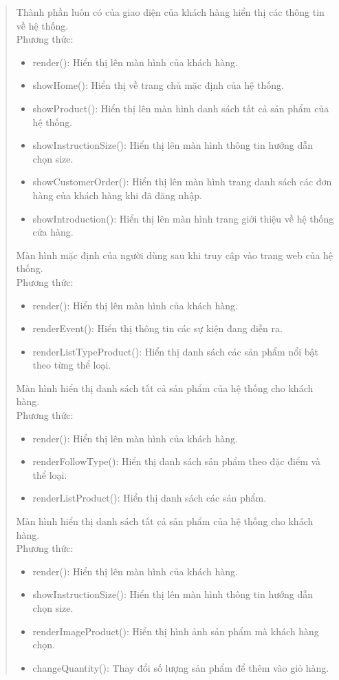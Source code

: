 \begin{quote}
    Thành phần luôn có của giao diện của khách hàng hiển thị các thông tin về hệ thống.\\
    Phương thức:
    \begin{itemize}
        \item render(): Hiển thị lên màn hình của khách hàng.
        \item showHome(): Hiển thị về trang chủ mặc định của hệ thống.
        \item showProduct(): Hiển thị lên màn hình danh sách tất cả sản phẩm của hệ thống.
        \item showInstructionSize(): Hiển thị lên màn hình thông tin hướng dẫn chọn size.
        \item showCustomerOrder(): Hiển thị lên màn hình trang danh sách các đơn hàng của khách hàng khi đã đăng nhập.
        \item showIntroduction(): Hiển thị lên màn hình trang giới thiệu về hệ thống cửa hàng.
    \end{itemize}
   
    Màn hình mặc định của người dùng sau khi truy cập vào trang web của hệ thống.\\
    Phương thức:
    \begin{itemize}
        \item render(): Hiển thị lên màn hình của khách hàng.
        \item renderEvent(): Hiển thị thông tin các sự kiện đang diễn ra.
        \item renderListTypeProduct(): Hiển thị danh sách các sản phẩm nổi bật theo từng thể loại.
    \end{itemize}
   
    Màn hình hiển thị danh sách tất cả sản phẩm của hệ thống cho khách hàng.\\
    Phương thức:
    \begin{itemize}
        \item render(): Hiển thị lên màn hình của khách hàng.
        \item renderFollowType(): Hiển thị danh sách sản phẩm theo đặc điểm và thể loại.
        \item renderListProduct(): Hiển thị danh sách các sản phẩm.
    \end{itemize}
   
     Màn hình hiển thị danh sách tất cả sản phẩm của hệ thống cho khách hàng.\\
    Phương thức:
    \begin{itemize}
        \item render(): Hiển thị lên màn hình của khách hàng.
        \item showInstructionSize(): Hiển thị lên màn hình thông tin hướng dẫn chọn size.
        \item renderImageProduct(): Hiển thị hình ảnh sản phẩm mà khách hàng chọn.
        \item changeQuantity(): Thay đổi số lượng sản phẩm để thêm vào giỏ hàng.
    \end{itemize}
   

\end{quote}
